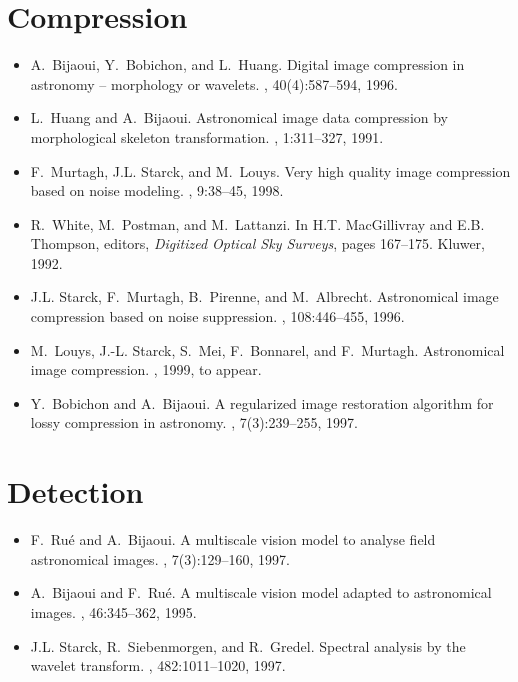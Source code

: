 \section{Compression}
\begin{itemize}
\item  A.~Bijaoui, Y.~Bobichon, and L.~Huang.
\newblock Digital image compression in astronomy -- morphology or wavelets.
, 40(4):587--594, 1996.

\item L.~Huang and A.~Bijaoui.
\newblock Astronomical image data compression by morphological skeleton
  transformation.
, 1:311--327, 1991.
 
\item F.~Murtagh, J.L. Starck, and M.~Louys.
\newblock Very high quality image compression based on noise modeling.
,
  9:38--45, 1998.

\item R.~White, M.~Postman, and M.~Lattanzi.
\newblock In H.T. MacGillivray and E.B. Thompson, editors, {\em Digitized
  Optical Sky Surveys}, pages 167--175. Kluwer, 1992.

\item J.L. Starck, F.~Murtagh, B.~Pirenne, and M.~Albrecht.
\newblock Astronomical image compression based on noise suppression.
,
  108:446--455, 1996.

\item M.~Louys, J.-L. Starck, S.~Mei, F.~Bonnarel, and F.~Murtagh.
\newblock Astronomical image compression.
, 1999,
\newblock to appear.

\item Y.~Bobichon and A.~Bijaoui.
\newblock A regularized image restoration algorithm for lossy compression in
  astronomy.
, 7(3):239--255, 1997.

\end{itemize}


\section{Detection}
\begin{itemize}
\item F.~Ru\'e and A.~Bijaoui.
\newblock A multiscale vision model to analyse field astronomical images.
, 7(3):129--160, 1997.

\item A.~Bijaoui and F.~Ru\'e.
\newblock A multiscale vision model adapted to astronomical images.
, 46:345--362, 1995.

\item J.L. Starck, R.~Siebenmorgen, and R.~Gredel.
\newblock Spectral analysis by the wavelet transform.
, 482:1011--1020, 1997.

\end{itemize}


